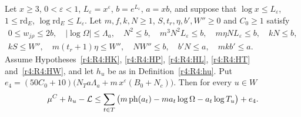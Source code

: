 \begin{theorem}\label{r4:R4:A4}
Let $x\ge3$, $0<\varepsilon<1$, $L_\varepsilon=x^\varepsilon$, $b=e^{L_\varepsilon}$, $a=xb$, and suppose that $\log x\le L_\varepsilon$, $1\le\mathrm{rd}_E$, $\log\mathrm{rd}_E\le L_\varepsilon$. Let $m,f,k,N\ge1$, $S,t_r,\eta,b',W''\ge0$ and $C_0\ge1$ satisfy
\begin{gather}
0\le w_{j\rho}\le2b,\quad \lvert\log\Omega\rvert\le\Lambda_a,\quad N^2\le b,\quad m^3N^2L_\varepsilon\le b,\quad m\eta NL_\varepsilon\le b,\quad kN\le b,\label{r4:R4:sz1}\\
kS\le W'',\quad m(t_r+1)\eta\le W'',\quad NW''\le b,\quad b'N\le a,\quad mkb'\le a.\label{r4:R4:sz2}
\end{gather}
Assume Hypotheses~\ref{r4:R4:HK}, \ref{r4:R4:HP}, \ref{r4:R4:HL}, \ref{r4:R4:HT} and~\ref{r4:R4:HW}, and let $h_u$ be as in Definition~\ref{r4:R4:hu}. Put $e_4=(50C_0+10)\big(N_Ta\Lambda_a+m\,x^\varepsilon(B_0+N_c)\big)$. Then for every $u\in W$
\[
\mu^C+h_u-\mathcal L\le\sum_{t\in T}\big(m\operatorname{ph}(a_t)-ma_t\log\Omega-a_t\log T_u\big)+e_4 .
\]
\end{theorem}

